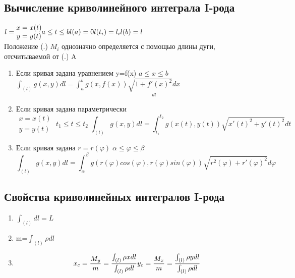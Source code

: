 \documentclass[12pt]{article}
\begin{document}
    \subsection{Вычисление криволинейного интеграла I-рода}
    \begin{math}
      l=\begin{matrix}
        x=x(t)\\
        y=y(t)
      \end{matrix} a\leq t \leq b\\
      l(a)=0\\
      l(t_i)=l_i\\
      l(b)=l
    \end{math}\\
    Положение (.) $M_i$ однозначно определяется с помощью длины дуги, отсчитываемой от (.) A\\
    \begin{enumerate}
      \item Если кривая задана уравнением y=f(x) $a \leq x \leq b$\\
      $\int_{(l)}g(x,y)dl=\int_{a}^{b}g(x,f(x))\underset{dl}{\sqrt{1+f'(x)^2}dx}$
      \item Если кривая задана параметрически\\
      \[\begin{matrix}
        x=x(t)\\
        y=y(t)
      \end{matrix} \; t_1 \leq t \leq t_2 \; \int_{(l)}g(x,y)dl=\int_{t_1}^{t_2}g(x(t),y(t))
      \sqrt{x'(t)^2+y'(t)^2}dt\]
      \item  Если кривая задана $r=r(\varphi) \; \alpha \leq \varphi \leq \beta$\\
      \[\int_{(l)}g(x,y)dl=\int_{\alpha}^{\beta}g(r(\varphi)cos(\varphi),r(\varphi)sin(\varphi))
      \sqrt{r^2(\varphi)+r'(\varphi)^2}d\varphi\] 
    \end{enumerate}
    \subsection{Свойства криволинейных интегралов I-рода}
    \begin{enumerate}
      \item $\int_{(l)}dl=L$
      \item m=$\int_{(l)}\rho dl$
      \item \[x_c=\frac{M_y}{m}=\frac{\int_{(l)}\rho x dl}{\int_{(l)} \rho dl} \\
      y_c=\frac{M_x}{m}=\frac{\int_{(l)}\rho y dl}{\int_{(l)}\rho dl}\]
    \end{enumerate}
\end{document}
